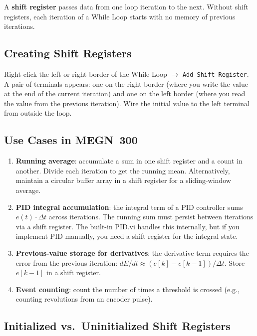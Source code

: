 A \textbf{shift register} passes data from one loop iteration to the next. Without shift registers, each iteration of a While Loop starts with no memory of previous iterations.

\subsection{Creating Shift Registers}

Right-click the left or right border of the While Loop $\to$ \texttt{Add Shift Register}. A pair of terminals appears: one on the right border (where you write the value at the end of the current iteration) and one on the left border (where you read the value from the previous iteration). Wire the initial value to the left terminal from outside the loop.

\subsection{Use Cases in MEGN~300}

\begin{enumerate}[leftmargin=1.5em]
\item \textbf{Running average}: accumulate a sum in one shift register and a count in another. Divide each iteration to get the running mean. Alternatively, maintain a circular buffer array in a shift register for a sliding-window average.

\item \textbf{PID integral accumulation}: the integral term of a PID controller sums $e(t) \cdot \Delta t$ across iterations. The running sum must persist between iterations via a shift register. The built-in PID.vi handles this internally, but if you implement PID manually, you need a shift register for the integral state.

\item \textbf{Previous-value storage for derivatives}: the derivative term requires the error from the previous iteration: $dE/dt \approx (e[k] - e[k-1])/\Delta t$. Store $e[k-1]$ in a shift register.

\item \textbf{Event counting}: count the number of times a threshold is crossed (e.g., counting revolutions from an encoder pulse).
\end{enumerate}

\subsection{Initialized vs.\ Uninitialized Shift Registers}

